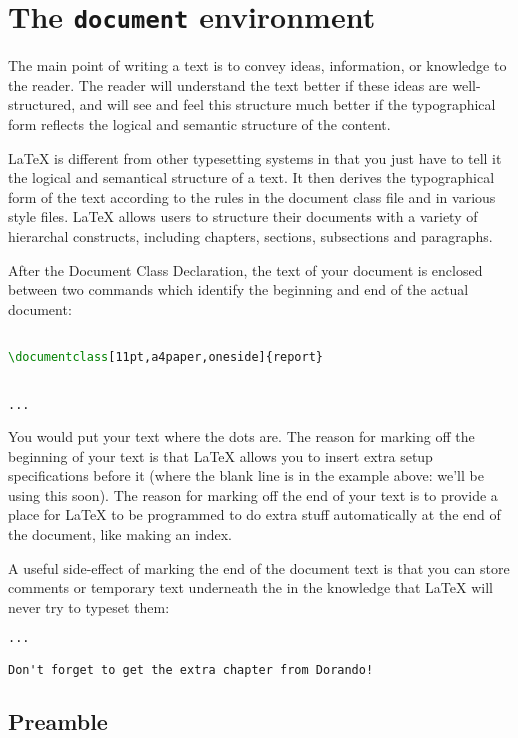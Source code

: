\section{The \texttt{document} environment}
The main point of writing a text is to convey ideas, information, or knowledge to the reader. The reader will
understand the text better if these ideas are well-structured, and will see and feel this structure much better if the typographical form reflects the logical and semantic structure of the content.

LaTeX is different from other typesetting systems in that you just have to tell it the logical and semantical structure of a text. It then derives
the typographical form of the text according to the rules in the document class file and in various style files. LaTeX allows users to structure their documents with a variety of hierarchal constructs, including chapters, sections, subsections and paragraphs. 

After the Document Class Declaration, the text of your document is enclosed between two commands which identify the beginning and end of the actual document:
\begin{lstlisting}[language={TeX}, breaklines=true,xleftmargin=15pt]

\documentclass[11pt,a4paper,oneside]{report}


...


\end{lstlisting}


You would put your text where the dots are. The reason for marking off the beginning of your text is that LaTeX allows you to insert extra setup specifications before it (where the blank line is in the example above: we'll be using this soon). The reason for marking off the end of your text is to provide a place for LaTeX to be programmed to do extra stuff automatically at the end of the document, like making an index.

A useful side-effect of marking the end of the document text is that you can store comments or temporary text underneath the \texttt{} in the knowledge that LaTeX will never try to typeset them:
\begin{lstlisting}[language={TeX}, breaklines=true,xleftmargin=15pt]
...

Don't forget to get the extra chapter from Dorando!

\end{lstlisting}

\subsection{ Preamble }

